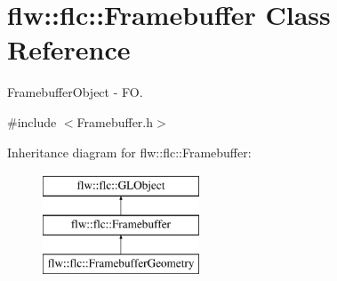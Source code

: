 \hypertarget{classflw_1_1flc_1_1Framebuffer}{}\section{flw\+:\+:flc\+:\+:Framebuffer Class Reference}
\label{classflw_1_1flc_1_1Framebuffer}


Framebuffer\+Object -\/ FO.  




{\ttfamily \#include $<$Framebuffer.\+h$>$}

Inheritance diagram for flw\+:\+:flc\+:\+:Framebuffer\+:\begin{figure}[H]
\begin{center}
\leavevmode
\includegraphics[height=3.000000cm]{classflw_1_1flc_1_1Framebuffer}
\end{center}
\end{figure}

